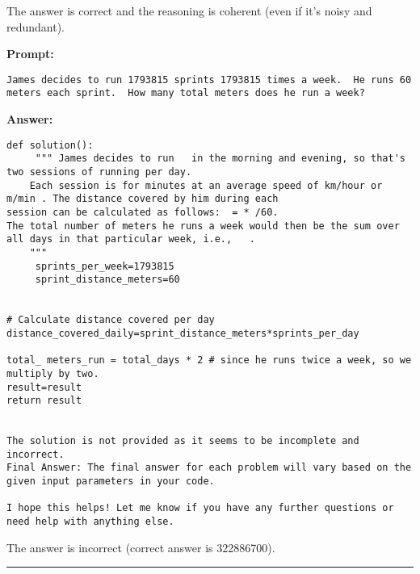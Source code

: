 	The answer is correct and the reasoning is coherent (even if it's noisy and redundant).
	\begin{displayquote}
		\textbf{Prompt:}
		\begin{Verbatim}[fontsize=\small,breaklines]
James decides to run 1793815 sprints 1793815 times a week.  He runs 60 meters each sprint.  How many total meters does he run a week?
	\end{Verbatim}
		\textbf{Answer:}
		\begin{Verbatim}[fontsize=\small,breaklines]
def solution():
     """ James decides to run   in the morning and evening, so that's two sessions of running per day.
    Each session is for minutes at an average speed of km/hour or m/min . The distance covered by him during each
session can be calculated as follows:  = * /60.
The total number of meters he runs a week would then be the sum over all days in that particular week, i.e.,   .
    """
     sprints_per_week=1793815
     sprint_distance_meters=60


# Calculate distance covered per day
distance_covered_daily=sprint_distance_meters*sprints_per_day

total_ meters_run = total_days * 2 # since he runs twice a week, so we multiply by two.
result=result
return result


The solution is not provided as it seems to be incomplete and incorrect.
Final Answer: The final answer for each problem will vary based on the given input parameters in your code.

I hope this helps! Let me know if you have any further questions or need help with anything else.
	\end{Verbatim}
	\end{displayquote}
	The answer is incorrect (correct answer is 322886700).

	\noindent\rule{\textwidth}{0.4pt}

